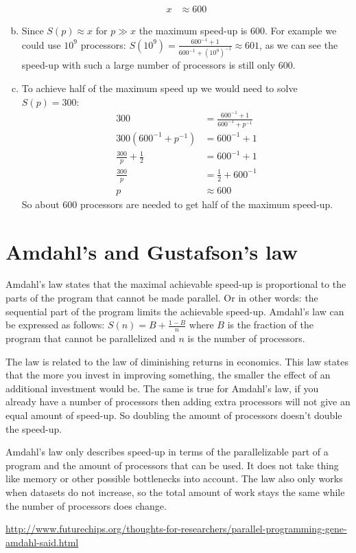 \documentclass[a4paper]{article}
\begin{document}
\begin{enumerate}[(a)]
\begin{align*}
			x &\approx 600
		\end{align*}
	\item Since $S(p) \approx x$ for $p \gg x$ the maximum speed-up is 600. For example we could use $10^9$ processors: $\displaystyle S(10^9) = \frac{600^{-1} + 1}{600^{-1} + (10^9)^{-1}} \approx 601$, as we can see the speed-up with such a large number of processors is still only 600.
	\item To achieve half of the maximum speed up we would need to solve $S(p) = 300$:
		\begin{align*}
			300 &= \frac{600^{-1} + 1}{600^{-1} + p^{-1}} \\
			300 (600^{-1} + p^{-1}) &= 600^{-1} + 1 \\
			\frac{300}{p} + \frac{1}{2} &= 600^{-1} + 1 \\
			\frac{300}{p} &= \frac{1}{2} + 600^{-1} \\
			p &\approx 600
		\end{align*}
		So about 600 processors are needed to get half of the maximum speed-up.
\end{enumerate}

\section{Amdahl's and Gustafson's law}
Amdahl's law states that the maximal achievable speed-up is proportional to the parts of the program that cannot be made parallel. Or in other words: the sequential part of the program limits the achievable speed-up. Amdahl's law can be expressed as follows: $S(n) = B + \frac{1 - B}{n}$ where $B$ is the fraction of the program that cannot be parallelized and $n$ is the number of processors.

The law is related to the law of diminishing returns in economics. This law states that the more you invest in improving something, the smaller the effect of an additional investment would be. The same is true for Amdahl's law, if you already have a number of processors then adding extra processors will not give an equal amount of speed-up. So doubling the amount of processors doesn't double the speed-up.

Amdahl's law only describes speed-up in terms of the parallelizable part of a program and the amount of processors that can be used. It does not take thing like memory or other possible bottlenecks into account. The law also only works when datasets do not increase, so the total amount of work stays the same while the number of processors does change.

\url{http://www.futurechips.org/thoughts-for-researchers/parallel-programming-gene-amdahl-said.html}
\end{document}
